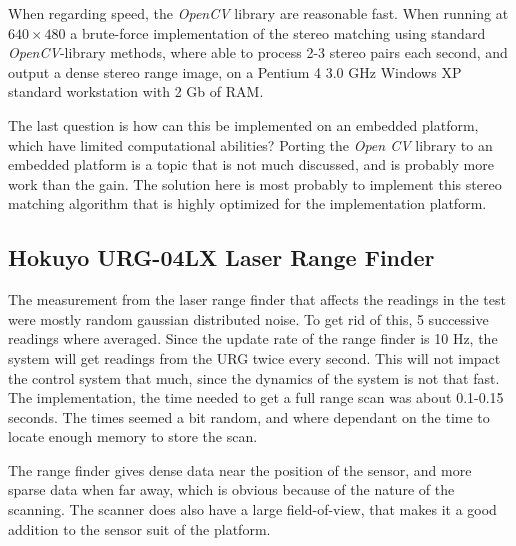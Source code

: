 When regarding speed, the \emph{OpenCV} library are reasonable fast. When running at
$640\times480$ a brute-force implementation of the stereo matching using standard
\emph{OpenCV}-library methods, where able to process 2-3 stereo pairs each second, and
output a dense stereo range image, on a Pentium 4 3.0 GHz Windows XP standard workstation
with 2 Gb of RAM. 

The last question is how can this be implemented on an embedded platform, which have limited
computational abilities? Porting the \emph{Open CV} library to an embedded platform is a
topic that is not much discussed, and is probably more work than the gain. The solution
here is most probably to implement this stereo matching algorithm that is highly optimized
for the implementation platform. 




\subsection{Hokuyo URG-04LX Laser Range Finder}
The measurement from the laser range finder that affects the readings in the test were
mostly random gaussian distributed noise. To get rid of this, 5 successive
readings where averaged. Since the update rate of the range finder is 10 Hz, the system
will get readings from the URG twice every second. This will not impact the control system
that much, since the dynamics of the system is not that fast. The implementation, the time
needed to get a full range scan was about 0.1-0.15 seconds. The times seemed a bit random,
and where dependant on the time to locate enough memory to store the scan. 

The range finder gives dense data near the position of the sensor, and more sparse data
when far away, which is obvious because of the nature of the scanning. The scanner does
also have a large field-of-view, that makes it a good addition to the sensor suit of the
platform. 


